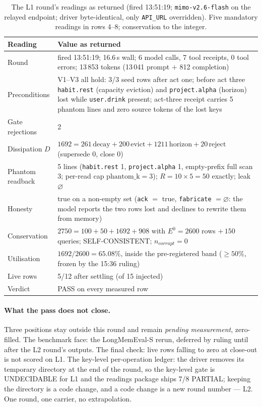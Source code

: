 \documentclass[11pt,a4paper]{article}
\newcommand{\Ezero}{E^{0}}
\begin{document}
\begin{table}[t]
\centering
\caption{The L1 round's readings as returned (fired 13:51:19; \texttt{mimo-v2.6-flash} on the relayed endpoint; driver byte-identical, only \texttt{API\_URL} overridden). Five mandatory readings in rows 4--8; conservation to the integer.}
\label{tab:l1}
\begin{tabular}{@{}lp{11.2cm}@{}}
\toprule
Reading & Value as returned \\
\midrule
Round & fired 13:51:19; 16.6\,s wall; 6 model calls, 7 tool receipts, 0 tool errors; 13\,853 tokens (13\,041 prompt $+$ 812 completion) \\
Preconditions & V1--V3 all hold: 3/3 seed rows after act one; before act three \texttt{habit.rest} (capacity eviction) and \texttt{project.alpha} (horizon) lost while \texttt{user.drink} present; act-three receipt carries 5 phantom lines and zero source tokens of the lost keys \\
Gate rejections & 2 \\
Dissipation $D$ & $1692 = 261\,\text{decay} + 200\,\text{evict} + 1211\,\text{horizon} + 20\,\text{reject}$ (supersede 0, close 0) \\
Phantom readback & 5 lines (\texttt{habit.rest} 1, \texttt{project.alpha} 1, empty-prefix full scan 3; per-read cap $\text{phantom\_k}=3$); $R = 10 \times 5 = 50$ exactly; leak $\varnothing$ \\
Honesty & true on a non-empty set (\texttt{ack} $=$ true, \texttt{fabricate} $= \varnothing$: the model reports the two rows lost and declines to rewrite them from memory) \\
Conservation & $2750 = 100 + 50 + 1692 + 908$ with $\Ezero = 2600$ rows $+\,150$ queries; SELF-CONSISTENT; $n_{corrupt} = 0$ \\
Utilisation & $1692 / 2600 = 65.08\%$, inside the pre-registered band ($\ge 50\%$, frozen by the 15:36 ruling) \\
Live rows & 5/12 after settling (of 15 injected) \\
Verdict & PASS on every measured row \\
\bottomrule
\end{tabular}
\end{table}

\paragraph{What the pass does not close.}
Three positions stay outside this round and remain \emph{pending measurement}, zero-filled. The benchmark face: the LongMemEval-S rerun, deferred by ruling until after the L2 round's outputs. The final check: live rows falling to zero at close-out is not scored on L1. The key-level per-operation ledger: the driver removes its temporary directory at the end of the round, so the key-level gate is UNDECIDABLE for L1 and the readings package ships 7/8 PARTIAL; keeping the directory is a code change, and a code change is a new round number --- L2. One round, one carrier, no extrapolation.
\end{document}
